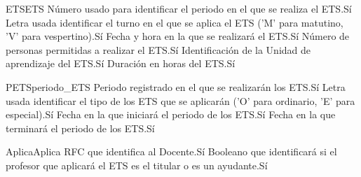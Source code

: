 \begin{cdtEntidad}{ETS}{ETS}
	{Número usado para identificar el periodo en el que se realiza el ETS.}{Sí}
	{Letra usada identificar el turno en el que se aplica el ETS ('M' para matutino, 'V' para vespertino).}{Sí}
	{Fecha y hora en la que se realizará el ETS.}{Sí}
	{Número de personas permitidas a realizar el ETS.}{Sí}
	{Identificación de la Unidad de aprendizaje del ETS.}{Sí}
	{Duración en horas del ETS.}{Sí}
\end{cdtEntidad}
\begin{cdtEntidad}{PETS}{periodo\_ETS}
	{Periodo registrado en el que se realizarán los ETS.}{Sí}
	{Letra usada identificar el tipo de los ETS que se aplicarán ('O' para ordinario, 'E' para especial).}{Sí}
	{Fecha en la que iniciará el periodo de los ETS.}{Sí}
	{Fecha en la que terminará el periodo de los ETS.}{Sí}
\end{cdtEntidad}
\begin{cdtEntidad}{Aplica}{Aplica}
	{RFC que identifica al Docente.}{Sí}
	{Booleano que identificará si el profesor que aplicará el ETS es el titular o es un ayudante.}{Sí}
\end{cdtEntidad}
